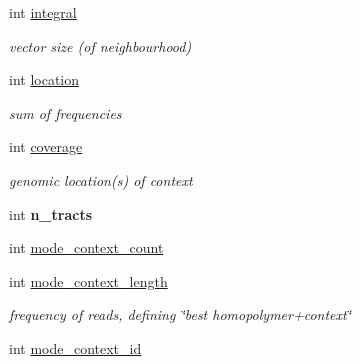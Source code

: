 \begin{DoxyCompactItemize}
int \hyperlink{structcontext__histogram__struct_aa2663ec4a4eaa334093034c756fb6fa6}{integral}
\begin{DoxyCompactList}\small\item\em vector size (of neighbourhood) \end{DoxyCompactList}\item 
\mbox{\label{structcontext__histogram__struct_a553abd859781c6df2e058c9aac509d69}} 
int \hyperlink{structcontext__histogram__struct_a553abd859781c6df2e058c9aac509d69}{location}
\begin{DoxyCompactList}\small\item\em sum of frequencies \end{DoxyCompactList}\item 
\mbox{\label{structcontext__histogram__struct_a32fd0f589471b4b3457bad2519d57c0c}} 
int \hyperlink{structcontext__histogram__struct_a32fd0f589471b4b3457bad2519d57c0c}{coverage}
\begin{DoxyCompactList}\small\item\em genomic location(s) of context \end{DoxyCompactList}\item 
\mbox{\label{structcontext__histogram__struct_ac6f7762a5c89e835ad78129e76b57b20}} 
int {\bfseries n\+\_\+tracts}
\item 
int \hyperlink{structcontext__histogram__struct_ac2bd5615e4cc759224487c986c58add3}{mode\+\_\+context\+\_\+count}
\item 
\mbox{\label{structcontext__histogram__struct_a6387d61ff7886c0edae1d661a863b15d}} 
int \hyperlink{structcontext__histogram__struct_a6387d61ff7886c0edae1d661a863b15d}{mode\+\_\+context\+\_\+length}
\begin{DoxyCompactList}\small\item\em frequency of reads, defining \char`\"{}best homopolymer+context\char`\"{} \end{DoxyCompactList}\item 
\mbox{\label{structcontext__histogram__struct_a21a1dce8d58f63d65e5653cc2addc9f3}} 
int \hyperlink{structcontext__histogram__struct_a21a1dce8d58f63d65e5653cc2addc9f3}{mode\+\_\+context\+\_\+id}

\end{DoxyCompactItemize}
